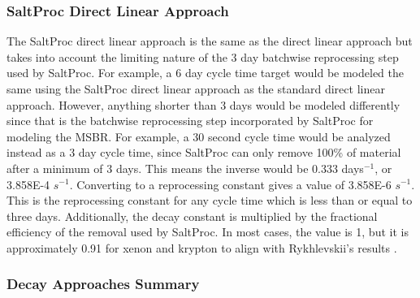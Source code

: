 

\subsubsection{SaltProc Direct Linear Approach}

The SaltProc direct linear approach is the same as the direct linear approach but takes into account the limiting nature of the 3 day batchwise reprocessing step used by SaltProc. For example, a 6 day cycle time target would be modeled the same using the SaltProc direct linear approach as the standard direct linear approach. However, anything shorter than 3 days would be modeled differently since that is the batchwise reprocessing step incorporated by SaltProc for modeling the MSBR. For example, a 30 second cycle time would be analyzed instead as a 3 day cycle time, since SaltProc can only remove 100\% of material after a minimum of 3 days. This means the inverse would be 0.333 days$^{-1}$, or 3.858E-4 $s^{-1}$. Converting to a reprocessing constant gives a value of 3.858E-6 $s^{-1}$. This is the reprocessing constant for any cycle time which is less than or equal to three days. Additionally, the decay constant is multiplied by the fractional efficiency of the removal used by SaltProc. In most cases, the value is 1, but it is approximately 0.91 for xenon and krypton to align with Rykhlevskii's results \cite{rykhlevskii_fuel_2020}.

\subsubsection{Decay Approaches Summary}



